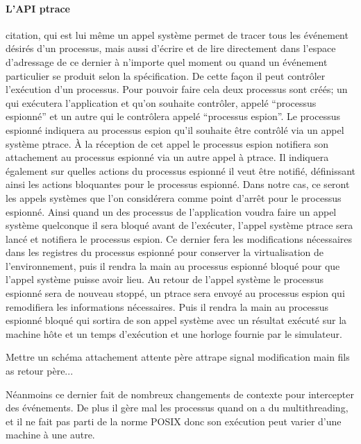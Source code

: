 \paragraph{L'API ptrace}
{\color{red}citation}, qui est lui même un appel système permet de tracer tous
les événement désirés d'un processus, mais aussi d'écrire et de lire directement
dans l'espace d'adressage de ce dernier à n'importe quel moment ou quand un
événement particulier se produit selon la spécification. De cette façon il peut
contrôler l'exécution d'un processus. Pour pouvoir faire cela deux processus
sont créés; un qui exécutera l'application et qu'on souhaite contrôler, appelé
``processus espionné'' et un autre qui le contrôlera appelé ``processus
espion''. Le processus espionné indiquera au processus espion qu'il souhaite
être contrôlé via un appel système ptrace. À la réception de cet appel le
processus espion notifiera son attachement au processus espionné via un autre
appel à ptrace. Il indiquera également sur quelles actions du processus espionné
il veut être notifié, définissant ainsi les actions bloquantes pour le processus
espionné. Dans notre cas, ce seront les appels systèmes que l'on considérera
comme point d'arrêt pour le processus espionné. Ainsi quand un des processus de
l'application voudra faire un appel système quelconque il sera bloqué avant de
l'exécuter, l'appel système ptrace sera lancé et notifiera le processus
espion. Ce dernier fera les modifications nécessaires dans les registres du
processus espionné pour conserver la virtualisation de l'environnement, puis il
rendra la main au processus espionné bloqué pour que l'appel système puisse
avoir lieu. Au retour de l'appel système le processus espionné sera de nouveau
stoppé, un ptrace sera envoyé au processus espion qui remodifiera les
informations nécessaires. Puis il rendra la main au processus espionné bloqué
qui sortira de son appel système avec un résultat exécuté sur la machine hôte et
un temps d'exécution et une horloge fournie par le simulateur.

{\color{red} Mettre un schéma attachement attente père attrape signal
  modification main fils as retour père...}

Néanmoins ce dernier fait de nombreux changements de contexte pour intercepter
des événements. De plus il gère mal les processus quand on a du multithreading,
et il ne fait pas parti de la norme POSIX donc son exécution peut varier d'une
machine à une autre.

